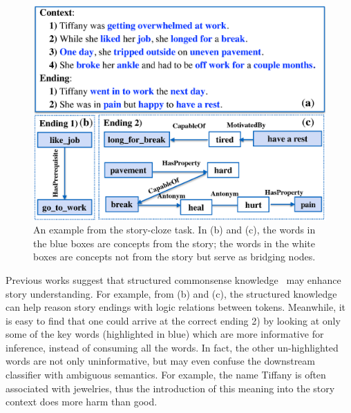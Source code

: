 \begin{figure}[th]
\centering\includegraphics[width=0.9\columnwidth]{pictures/story_example}
\caption{An example from the story-cloze task. 
In (b) and (c), the words in the blue boxes are concepts from the story; 
the words in the white boxes are concepts not from the story 
but serve as bridging nodes. }
\label{fig:story}
\end{figure}

Previous works suggest that structured commonsense knowledge~\cite{sap2019atomic,li2019story}
may enhance story understanding. 
For example, from  (b) and (c), the structured knowledge
can help reason story endings with logic relations between tokens. 
Meanwhile, it is easy to find that one could arrive at the correct
ending 2) by looking at only some of the key words (highlighted in blue) which are 
more informative for inference, instead of
consuming all the words. 
In fact, the other un-highlighted words are not only
uninformative, but may even confuse the downstream classifier with 
ambiguous semantics. For example, the name Tiffany is often associated 
with jewelries, thus the introduction of this meaning into the story context 
does more harm than good.


